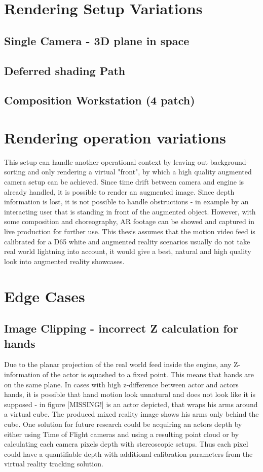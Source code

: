 \section{Rendering Setup Variations}
\subsection{Single Camera - 3D plane in space}
\subsection{Deferred shading Path}
\subsection{Composition Workstation (4 patch)}

\section{Rendering operation variations}

This setup can handle another operational context by leaving out 
background-sorting and only rendering a virtual "front", by which a high 
quality augmented camera setup can be achieved. Since time drift between camera 
and engine is already handled, it is possible to render an augmented image. 
Since depth information is lost, it is not possible to handle obstructions - in 
example by an interacting user that is standing in front of the augmented 
object. However, with some composition and choreography, AR footage can be 
showed and captured in live production for further use.
\newline
This thesis assumes that the motion video feed is calibrated for a D65 white 
and augmented reality scenarios usually do not take real world lightning into 
account, it would give a best, natural and high quality look into augmented 
reality showcases.

\section{Edge Cases}
\subsection{Image Clipping - incorrect Z calculation for hands}

Due to the planar projection of the real world feed inside the engine, any 
Z-information of the actor is squashed to a fixed point. This means that hands 
are on the same plane. In cases with high z-difference between actor and actors 
hands, it is possible that hand motion look unnatural and does not look like it 
is supposed - in figure [MISSING!] is an actor depicted, that wraps his arms 
around a virtual cube. The produced mixed reality image shows his arms only 
behind the cube.
One solution for future research could be acquiring an actors depth by either 
using Time of Flight cameras and using a resulting point cloud or by 
calculating each camera pixels depth with stereoscopic setups. Thus each pixel 
could have a quantifiable depth with additional calibration parameters from the 
virtual reality tracking solution.

